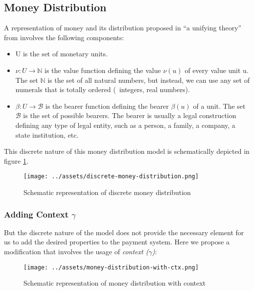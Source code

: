 \subsection{Money Distribution}

A representation of money and its distribution proposed in ``a unifying theory''
from \citeauthor{buldas2021unifying} involves the following components:

\begin{itemize}
    \item U is the set of monetary units.

    \item $\nu : U \rightarrow \mathbb{N}$ is the value function defining the value $\nu(u)$ of
every value unit u. The set $\mathbb{N}$ is the set of all natural numbers, but instead, we can use
any set of numerals that is totally ordered (\eg\ integers, real numbers).

    \item $\beta : U \rightarrow \mathcal{B}$ is the bearer function defining the bearer $\beta(u)$
of a unit. The set $\mathcal{B}$ is the set of possible bearers. The bearer is usually a legal
construction defining any type of legal entity, such as a person, a family, a company, a state
institution, etc.
\end{itemize}

This discrete nature of this money distribution model is schematically depicted
in figure \ref{fig:discrete-md}.

\begin{figure}[h]
    \centering
    \texttt{[image: ../assets/discrete-money-distribution.png]}
    \caption{Schematic representation of discrete money distribution}
    \label{fig:discrete-md}
\end{figure}

\subsubsection{Adding Context $\gamma$}

But the discrete nature of the model does not provide the necessary element for us to add the
desired properties to the payment system. Here we propose a modification that involves the usage
of \textit{context ($\gamma$)}:

\begin{figure}[h]
    \centering
    \texttt{[image: ../assets/money-distribution-with-ctx.png]}
    \caption{Schematic representation of money distribution with context}
    \label{fig:md-with-ctx}
\end{figure}

